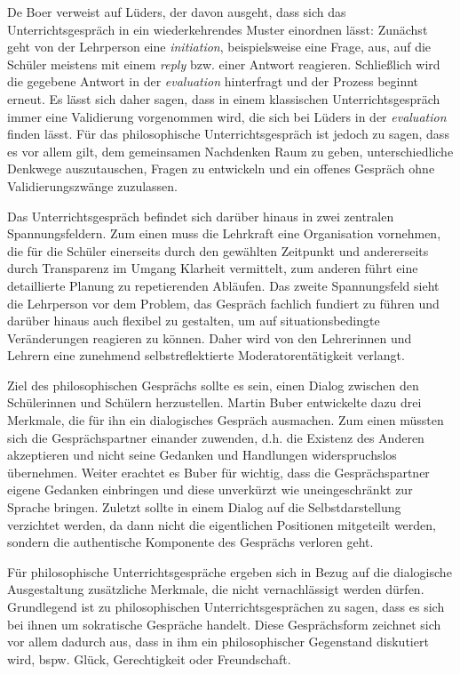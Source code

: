 De Boer verweist auf Lüders, der davon ausgeht, dass sich das Unterrichtsgespräch in ein wiederkehrendes Muster einordnen lässt\cite[S.\,28]{HB15}:
 Zunächst geht von der Lehrperson eine \textit{initiation}, beispielsweise eine Frage, aus, auf die Schüler meistens mit einem \textit{reply} bzw. einer Antwort reagieren. 
 Schließlich wird die gegebene Antwort in der \textit{evaluation} hinterfragt und der Prozess beginnt erneut. 
 Es lässt sich daher sagen, dass in einem klassischen Unterrichtsgespräch immer eine Validierung vorgenommen wird, die sich bei Lüders in der \textit{evaluation} finden lässt. 
 Für das philosophische Unterrichtsgespräch ist jedoch zu sagen, dass es vor allem gilt, \glqq dem gemeinsamen Nachdenken Raum zu geben, unterschiedliche Denkwege auszutauschen, Fragen zu entwickeln und ein offenes Gespräch ohne Validierungszwänge zuzulassen\grqq{}\cite[S.\,159]{HD15}.
 
Das Unterrichtsgespräch befindet sich darüber hinaus in zwei zentralen Spannungsfeldern. 
Zum einen muss die Lehrkraft eine Organisation vornehmen, die für die Schüler einerseits durch den gewählten Zeitpunkt und andererseits durch Transparenz im Umgang Klarheit vermittelt, zum anderen führt eine detaillierte Planung zu repetierenden Abläufen\cite[S.\,31]{HB15}. 
Das zweite Spannungsfeld sieht die Lehrperson vor dem Problem, das Gespräch fachlich fundiert zu führen und darüber hinaus auch flexibel zu gestalten, um auf situationsbedingte Veränderungen reagieren zu können. 
Daher wird von den Lehrerinnen und Lehrern eine zunehmend selbstreflektierte Moderatorentätigkeit verlangt.

Ziel des philosophischen Gesprächs sollte es sein, einen Dialog zwischen den Schülerinnen und Schülern herzustellen. 
Martin Buber entwickelte dazu drei Merkmale, die für ihn ein dialogisches Gespräch ausmachen. 
Zum einen müssten sich die Gesprächspartner einander zuwenden, d.h. die Existenz des Anderen akzeptieren und nicht seine Gedanken und Handlungen widerspruchslos  übernehmen\cite[S.\,106]{MB15}.
Weiter erachtet es Buber für wichtig, dass die Gesprächspartner eigene Gedanken einbringen und diese unverkürzt wie uneingeschränkt zur Sprache bringen. 
Zuletzt sollte in einem Dialog auf die Selbstdarstellung verzichtet werden, da dann nicht die eigentlichen Positionen mitgeteilt werden, sondern die authentische Komponente des Gesprächs verloren geht.

Für philosophische Unterrichtsgespräche ergeben sich in Bezug auf die dialogische Ausgestaltung zusätzliche Merkmale, die nicht vernachlässigt werden dürfen. 
Grundlegend ist zu philosophischen Unterrichtsgesprächen zu sagen, dass es sich bei ihnen um sokratische Gespräche handelt. 
Diese Gesprächsform zeichnet sich vor allem dadurch aus, \glqq dass in ihm ein philosophischer Gegenstand diskutiert wird, bspw. Glück, Gerechtigkeit oder Freundschaft.\grqq{}\cite[S.\,27]{BB10}

